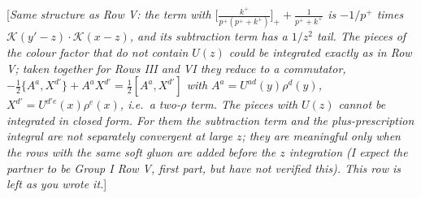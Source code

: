\documentclass[9pt]{article}
\numberwithin{equation}{section}
\newcommand{\rnote}[1]{{\color{teal}[\textit{#1}]}}
\begin{document}
\rnote{Same structure as Row V: the term with $\big[\frac{k^{+}}{p^{+}(p^{+}+k^{+})}\big]_{+}+\frac{1}{p^{+}+k^{+}}$ is $-1/p^{+}$ times $\mathcal{K}(y'-z)\cdot\mathcal{K}(x-z)$, and its subtraction term has a $1/z^{2}$ tail. The pieces of the colour factor that do not contain $U(z)$ could be integrated exactly as in Row V; taken together for Rows III and VI they reduce to a commutator, $-\frac{1}{2}\{A^{a},X^{d'}\}+A^{a}X^{d'}=\frac{1}{2}[A^{a},X^{d'}]$ with $A^{a}=U^{ad}(y)\rho^{d}(y)$, $X^{d'}=U^{d'e}(x)\rho^{e}(x)$, i.e.\ a two-$\rho$ term. The pieces with $U(z)$ cannot be integrated in closed form. For them the subtraction term and the plus-prescription integral are not separately convergent at large $z$; they are meaningful only when the rows with the same soft gluon are added before the $z$ integration (I expect the partner to be Group I Row V, first part, but have not verified this). This row is left as you wrote it.}
\end{document}
